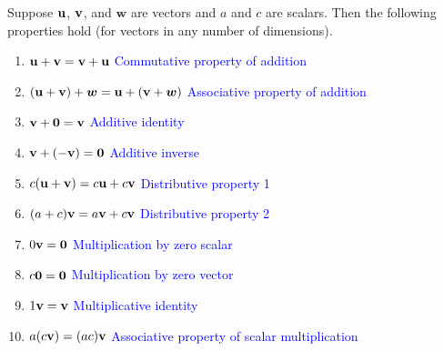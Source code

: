 \documentclass[mathNotesPreamble]{subfiles}
\begin{document}
  \begin{thmBox*}
    Suppose ${\mathbf{u}}$, ${\mathbf{v}}$, and $\bm{w}$ are vectors and $a$ and $c$ are scalars. Then the following properties hold (for vectors in any number of dimensions).
    \begin{center}
      \begin{minipage}{0.925\linewidth}
        \begin{enumerate}
          \item 
            ${\mathbf{u}}+{\mathbf{v}}={\mathbf{v}}+{\mathbf{u}}$ 
            \tab \textcolor{blue}{Commutative property of addition}
          \item 
            ${\left({\mathbf{u}}+{\mathbf{v}}\right)}+\bm w={\mathbf{u}}+{\left({\mathbf{v}}+\bm w\right)}$
            \tab \textcolor{blue}{Associative property of addition}
          \item 
            ${\mathbf{v}}+\mathbf{0}={\mathbf{v}}$
            \tab \textcolor{blue}{Additive identity}
          \item 
            ${\mathbf{v}}+{\left(-{\mathbf{v}}\right)}=\mathbf{0}$
            \tab \textcolor{blue}{Additive inverse}
          \item 
            $c{\left({\mathbf{u}}+{\mathbf{v}}\right)}=c{\mathbf{u}}+c{\mathbf{v}}$
            \tab \textcolor{blue}{Distributive property 1}
          \item 
            ${\left(a+c\right)}{\mathbf{v}}=a{\mathbf{v}}+c{\mathbf{v}}$
            \tab \textcolor{blue}{Distributive property 2}
          \item 
            $0{\mathbf{v}}=\mathbf{0}$
            \tab \textcolor{blue}{Multiplication by zero scalar}
          \item 
            $c\mathbf{0}=\mathbf{0}$
            \tab \textcolor{blue}{Multiplication by zero vector}
          \item 
            $1{\mathbf{v}}={\mathbf{v}}$
            \tab \textcolor{blue}{Multiplicative identity}
          \item 
            $a{\left(c{\mathbf{v}}\right)}={\left(ac\right)}{\mathbf{v}}$
            \tab \textcolor{blue}{Associative property of scalar multiplication}
        \end{enumerate}
      \end{minipage}
    \end{center}
  \end{thmBox*}
  \pagebreak
\end{document}
